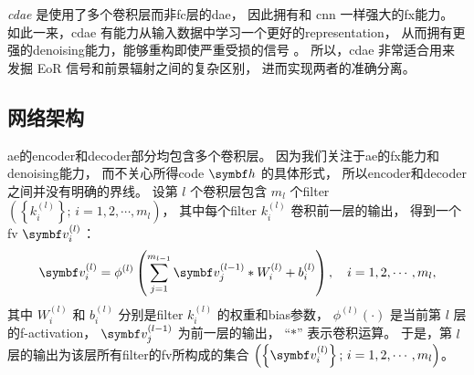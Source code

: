 \emph{\ac{cdae}} 是使用了多个卷积层而非\ac{fc}层的\ac{dae}，
因此拥有和 \ac{cnn} 一样强大的\ac{fx}能力。
如此一来，\ac{cdae} 有能力从输入数据中学习一个更好的\ac{representation}，
从而拥有更强的\ac{denoising}能力，能够重构即使严重受损的信号 \cite{du2017}。
所以，\ac{cdae} 非常适合用来发掘 EoR 信号和前景辐射之间的复杂区别，
进而实现两者的准确分离。

\subsection{网络架构}
\label{sec:architecture}

\begin{figure}[htp]
  \centering
\end{figure}

\ac{ae}的\ac{encoder}和\ac{decoder}部分均包含多个卷积层。
因为我们关注于\ac{ae}的\ac{fx}能力和\ac{denoising}能力，
而不关心所得\ac{code} $\B{h}$ 的具体形式，
所以\ac{encoder}和\ac{decoder}之间并没有明确的界线。
设第 $l$ 个卷积层包含 $m_l$ 个\ac{filter}
$\left(\left\{ k_{i}^{(l)} \right\};\, i = 1, 2, \cdots, m_l \right)$，
其中每个\ac{filter} $k_{i}^{(l)}$ 卷积前一层的输出，
得到一个\ac{fv} $\B{v}_{i}^{(l)}$：
\begin{equation}
  \label{eq:conv}
  \B{v}_{i}^{(l)} = \phi^{(l)} \left( \sum_{j=1}^{m_{l-1}}
    \B{v}_{j}^{(l-1)} * W_i^{(l)} + b_i^{(l)} \right) ,
    \quad i = 1, 2, \cdots, m_{l} ,
\end{equation}
其中
$W_i^{(l)}$ 和 $b_i^{(l)}$ 分别是\ac{filter} $k_{i}^{(l)}$
的权重和\ac{bias}参数，
$\phi^{(l)}(\cdot)$ 是当前第 $l$ 层的\ac{f-activation}，
$\B{v}_{j}^{(l-1)}$ 为前一层的输出，
\enquote{$*$} 表示卷积运算。
于是，第 $l$ 层的输出为该层所有\ac{filter}的\ac{fv}所构成的集合
$\left(\left\{ \B{v}_{i}^{(l)} \right\};\, i = 1, 2, \cdots, m_l \right)$。

